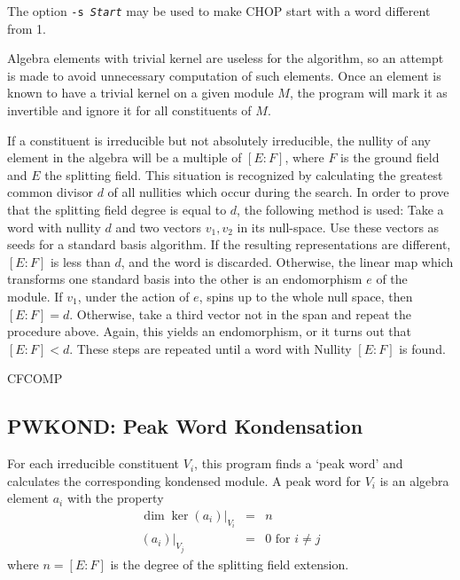 The option {\tt -s~{\it Start}} may be used to make CHOP start with
a word different from 1.

Algebra elements with trivial kernel are useless for the algorithm, so
an attempt is made to avoid unnecessary computation of such elements.
Once an element is known to have a trivial kernel on a given module
$M$, the program will mark it as invertible and ignore it for all
constituents of $M$.

If a constituent is irreducible but not absolutely irreducible, the
nullity of any element in the algebra will be a multiple of $[E:F]$,
where $F$ is the ground field and $E$ the splitting field. This
situation is recognized by calculating the greatest
common divisor $d$ of all nullities which occur during the search.
In order to prove that the splitting field degree is equal to
$d$, the following method is used: Take a word with nullity $d$
and two vectors $v_1, v_2$ in its null-space. Use these vectors as
seeds for a standard basis algorithm. If the resulting representations
are different, $[E:F]$ is less than $d$, and the word is discarded.
Otherwise, the linear map
which transforms one standard basis into the other is an endomorphism
$e$ of the module. If $v_1$, under the action of $e$, spins up to
the whole null space, then $[E:F]=d$. Otherwise, take a third vector
not in the span and repeat the procedure above. Again, this yields an
endomorphism, or it turns out that $[E:F]<d$.
These steps are repeated until a word with Nullity $[E:F]$ is found.

\SeeAlso
CFCOMP

\subsection{PWKOND: Peak Word Kondensation}
\Syntax
{}

\Description
For each irreducible constituent $V_i$, this program finds a `peak word'
and calculates the corresponding kondensed module.
A peak word for $V_i$ is an algebra element $a_i$ with the property
\begin{eqnarray*}
	\dim\ker(a_i)|_{V_i} & = & n\\
	(a_i)|_{V_j} & = & 0\mbox{\ \ \ for }i\neq j
\end{eqnarray*}
where $n=[E:F]$ is the degree of the splitting field extension.

